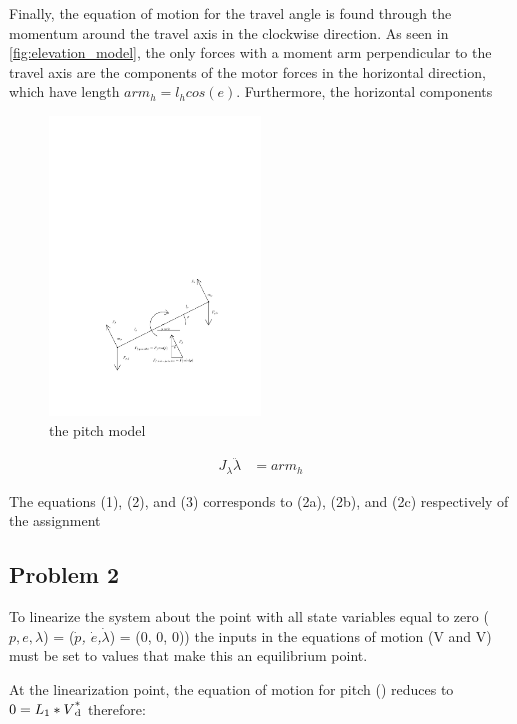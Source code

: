 Finally, the equation of motion for the travel angle is found through the momentum around the travel axis in the  clockwise direction. As seen in \cref{fig:elevation_model}, the only forces with a moment arm perpendicular to the travel axis are the components of the motor forces in the horizontal direction, which have length $arm_h = l_hcos(e)$. Furthermore, the horizontal components

\begin{figure}[H]
\caption{the pitch model}
\label{fig:pitch_model}
\includegraphics[width=0.5\textwidth]{images/pitch_model}
\end{figure}

\begin{align*}
J_\lambda\ddot{\lambda} &= arm_h
\end{align*}

The equations (1), (2), and (3) corresponds to (2a), (2b), and (2c) respectively of the assignment \cite[p.13]{assignment}

\subsection{Problem 2}
To linearize the system about the point with all state variables equal
to zero ($p, e, \lambda$) = (\textit{$\dot{p}$,
  $\dot{e}$,$\dot{\lambda}$}) = (0, 0, 0))  the inputs in the
equations of motion (V and V) must be set to
values that make this an equilibrium point.

At the linearization point, the equation of motion for pitch
() reduces to $0 = L\SB{1} *
V\SPSB{*}{d}$ therefore:

